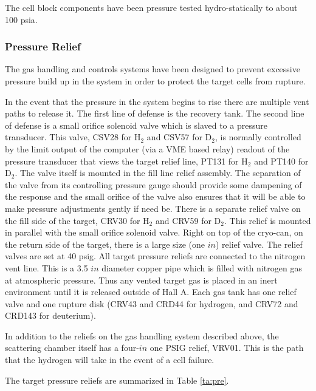 {\begin{safetyen}{10}{5}
The cell block components have been pressure tested hydro-statically
to about 100 psia.

\subsubsection{ Pressure Relief}

The gas handling and controls systems have been designed to 
prevent excessive pressure build up in the system in order to
protect the target cells from rupture.

In the event that the pressure in the system begins to rise there are multiple
vent paths to release it. The first line of defense is the recovery tank.
The second line of defense is a small orifice solenoid valve
which is slaved to a pressure transducer. This valve, CSV28 for H$_2$ and
CSV57 for D$_2$, 
is normally controlled by the limit
output of the computer (via a VME based relay) readout of
the pressure transducer that views the target
relief line, PT131 for H$_2$ and PT140 for D$_2$. The valve itself is mounted
in the fill line relief assembly. The separation of the valve from its
controlling pressure gauge should provide some dampening of the response
and the small orifice of the valve also ensures that it will
be able to make pressure adjustments gently if need be.
There is 
a separate relief valve on the fill side of the target, CRV30 for H$_2$ and
CRV59 for D$_2$. This relief is mounted in parallel with the small orifice 
solenoid valve. Right on top of the cryo-can, on the return side of the target,
there is a large size (one $in$) relief valve. The relief valves are set at 
40 psig.
All target pressure reliefs are connected to the
nitrogen vent line.
This is a 3.5 $in$ diameter 
copper pipe which is filled with nitrogen gas at atmospheric pressure.
Thus any vented target gas is placed in an inert environment until it is
released outside of Hall A. Each gas tank has one relief valve and one rupture
disk (CRV43 and CRD44 for hydrogen, and CRV72 and CRD143 for deuterium).
 
In addition to the reliefs on the gas handling system described above, the
scattering chamber itself has a four-$in$ one PSIG relief, VRV01.
This is the path that the
hydrogen will take in the event of a cell failure.   

The target pressure reliefs are summarized in Table \ref{ta:pre}.


\end{safetyen}}
